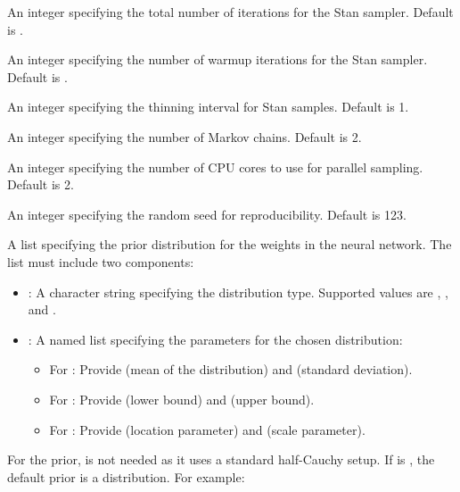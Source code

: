 \documentclass[a4paper]{book}
\begin{document}
\begin{Arguments}
\begin{ldescription}
\item[\code{iter}] An integer specifying the total number of iterations for the Stan sampler. Default is .

\item[\code{warmup}] An integer specifying the number of warmup iterations for the Stan sampler. Default is .

\item[\code{thin}] An integer specifying the thinning interval for Stan samples. Default is 1.

\item[\code{chains}] An integer specifying the number of Markov chains. Default is 2.

\item[\code{cores}] An integer specifying the number of CPU cores to use for parallel sampling. Default is 2.

\item[\code{seed}] An integer specifying the random seed for reproducibility. Default is 123.

\item[\code{prior\_weights}] A list specifying the prior distribution for the weights in the neural network.
The list must include two components:
\begin{itemize}

\item{} : A character string specifying the distribution type. Supported values are
, , and .
\item{} : A named list specifying the parameters for the chosen distribution:
\begin{itemize}

\item{} For : Provide  (mean of the distribution) and  (standard deviation).
\item{} For : Provide  (lower bound) and  (upper bound).
\item{} For : Provide  (location parameter) and  (scale parameter).

\end{itemize}


\end{itemize}

For the  prior,  is not needed as it uses a standard half-Cauchy setup.
If  is , the default prior is a  distribution.
For example:
\begin{itemize}


\end{itemize}
\end{ldescription}
\end{Arguments}
\end{document}
